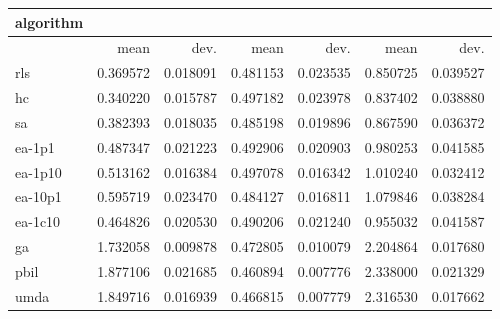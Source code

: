 \begin{tabular}{@{}l*{6}{>{{}}N{1}{2}}@{}}
\toprule
{algorithm} &  &  &  \\
\midrule
& {mean} & {dev.} & {mean} & {dev.} & {mean} & {dev.} \\
\midrule
rls & 0.369572 & 0.018091 & 0.481153 & 0.023535 & 0.850725 & 0.039527 \\
 hc & 0.340220 & 0.015787 & 0.497182 & 0.023978 & 0.837402 & 0.038880 \\
 sa & 0.382393 & 0.018035 & 0.485198 & 0.019896 & 0.867590 & 0.036372 \\
 ea-1p1 & 0.487347 & 0.021223 & 0.492906 & 0.020903 & 0.980253 & 0.041585 \\
 ea-1p10 & 0.513162 & 0.016384 & 0.497078 & 0.016342 & 1.010240 & 0.032412 \\
 ea-10p1 & 0.595719 & 0.023470 & 0.484127 & 0.016811 & 1.079846 & 0.038284 \\
 ea-1c10 & 0.464826 & 0.020530 & 0.490206 & 0.021240 & 0.955032 & 0.041587 \\
 ga & 1.732058 & 0.009878 & 0.472805 & 0.010079 & 2.204864 & 0.017680 \\
 pbil & 1.877106 & 0.021685 & 0.460894 & 0.007776 & 2.338000 & 0.021329 \\
 umda & 1.849716 & 0.016939 & 0.466815 & 0.007779 & 2.316530 & 0.017662 \\
 \bottomrule
\end{tabular}
